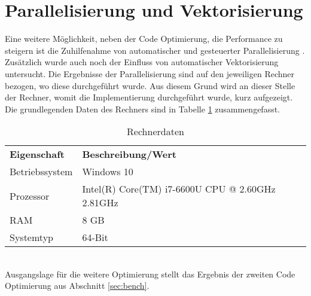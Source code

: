 \section{Parallelisierung und Vektorisierung}
Eine weitere Möglichkeit, neben der Code Optimierung, die Performance zu steigern ist die Zuhilfenahme von automatischer und gesteuerter Parallelisierung \cite{Kessler.Wintersemester201718}. Zusätzlich wurde auch noch der Einfluss von automatischer Vektorisierung untersucht. Die Ergebnisse der Parallelisierung sind auf den jeweiligen Rechner bezogen, wo diese durchgeführt wurde. Aus diesem Grund wird an dieser Stelle der Rechner, womit die Implementierung durchgeführt wurde, kurz aufgezeigt. Die grundlegenden Daten des Rechners sind in Tabelle \ref{tab:Rechnerdaten} zusammengefasst.
\begin{table}[h]
	\centering	\begin{tabular}{l p{10cm}}
		\textbf{Eigenschaft} & \textbf{Beschreibung/Wert}\\
		Betriebssystem & Windows 10\\
		Prozessor & Intel(R) Core(TM) i7-6600U CPU @ 2.60GHz 2.81GHz\\
		RAM & 8 GB\\
		Systemtyp & 64-Bit 
	\end{tabular}
	\caption{Rechnerdaten}
	\label{tab:Rechnerdaten}
\end{table}\\
Ausgangslage für die weitere Optimierung stellt das Ergebnis der  zweiten Code Optimierung aus Abschnitt \ref{sec:bench}.
